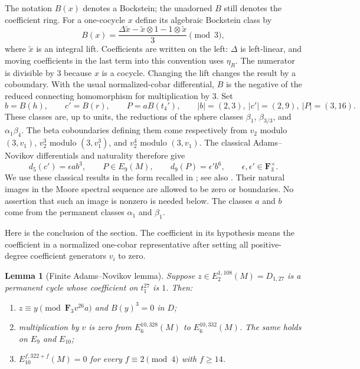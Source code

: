\documentclass[11pt]{article}
\newtheorem{lemma}[theorem]{Lemma}
\theoremstyle{definition}
\theoremstyle{remark}
\numberwithin{equation}{section}
\begin{document}
The notation $B(x)$ denotes a Bockstein; the unadorned $B$ still
denotes the coefficient ring.  For a one-cocycle $x$ define its
algebraic Bockstein class by
\begin{equation}\label{finite:bockstein}
 B(x)=\frac{\Delta\widetilde x-\widetilde x\otimes1
                  -1\otimes\widetilde x}{3}\pmod3,
\end{equation}
where $\widetilde x$ is an integral lift.  Coefficients are written on
the left: $\Delta$ is left-linear, and moving coefficients in the last
term into this convention uses $\eta_R$.  The numerator is divisible
by $3$ because $x$ is a cocycle.  Changing the lift changes the result
by a coboundary.  With the usual normalized-cobar differential,
$B$ is the negative of the reduced connecting homomorphism for
multiplication by $3$.  Set
\[
 b=B(h),\qquad c'=B(r),\qquad P=aB(t_4'),
 \qquad |b|=(2,3),\ |c'|=(2,9),\ |P|=(3,16).
\]
These classes are, up to units, the reductions of the sphere classes
$\beta_1$, $\beta_{3/3}$, and $\alpha_1\beta_4$.  The beta
coboundaries defining them come respectively from $v_2$ modulo
$(3,v_1)$, $v_2^3$ modulo $(3,v_1^3)$, and $v_2^4$ modulo $(3,v_1)$.
The classical Adams--Novikov differentials and naturality therefore
give
\begin{equation}\label{finite:classical-differentials}
 d_5(c')=\epsilon ab^3,\qquad P\in E_9(M),\qquad
 d_9(P)=\epsilon' b^6,
 \qquad \epsilon,\epsilon'\in\mathbf F_3^\times.
\end{equation}
We use these classical results in the form recalled in
\cite[Lemma 2.5]{BelmontShimomura}; see also \cite{Ravenel}.
Their natural images in the Moore spectral sequence are allowed to
be zero or boundaries.  No assertion that such an image is nonzero
is needed below.  The classes $a$ and $b$ come from the permanent
classes $\alpha_1$ and $\beta_1$.

Here is the conclusion of the section.  The coefficient in its
hypothesis means the coefficient in a normalized one-cobar
representative after setting all positive-degree coefficient
generators $v_i$ to zero.

\begin{lemma}[Finite Adams--Novikov lemma]\label{finite:main}
Suppose $z\in E_2^{1,108}(M)=D_{1,27}$ is a permanent cycle whose
coefficient on $t_1^{27}$ is $1$.  Then:
\begin{enumerate}[label=\textup{(\roman*)}]
 \item $z\equiv y\pmod{\mathbf F_3v^{26}a}$ and $B(y)^3=0$ in $D$;
 \item multiplication by $v$ is zero from
 $E_6^{10,328}(M)$ to $E_6^{10,332}(M)$.  The same holds on
 $E_9$ and $E_{10}$;
 \item $E_{10}^{f,322+f}(M)=0$ for every
 $f\equiv2\pmod4$ with $f\geq14$.
\end{enumerate}
\end{lemma}
\end{document}

